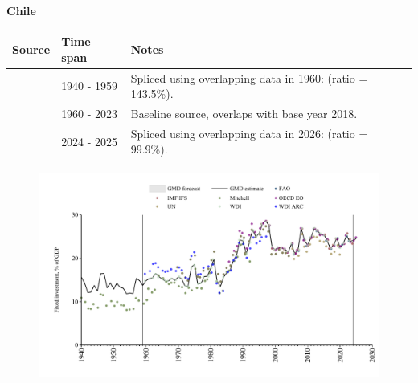 \documentclass[12pt,a4paper,landscape]{article}
\begin{document}
\begin{adjustbox}{max totalsize={\paperwidth}{\paperheight},center}
\begin{minipage}[t][\textheight][t]{\textwidth}
\vspace*{0.5cm}
{}
\begin{center}
{\Large\bfseries Chile}
\end{center}
\vspace{0.5cm}
\begin{table}[H]
\centering
\small
\begin{tabular}{|l|l|l|}
\hline
\textbf{Source} & \textbf{Time span} & \textbf{Notes} \\
\hline
\rowcolor{white}\cite{Mitchell}& 1940 - 1959 &Spliced using overlapping data in 1960: (ratio = 143.5\%).\\
\rowcolor{lightgray}\cite{WDI}& 1960 - 2023 &Baseline source, overlaps with base year 2018.\\
\rowcolor{white}\cite{OECD_EO}& 2024 - 2025 &Spliced using overlapping data in 2026: (ratio = 99.9\%).\\
\hline
\end{tabular}
\end{table}
\begin{figure}[H]
\centering
\includegraphics[width=\textwidth,height=0.6\textheight,keepaspectratio]{graphs/CHL_finv_GDP.pdf}
\end{figure}
\end{minipage}
\end{adjustbox}
\end{document}
